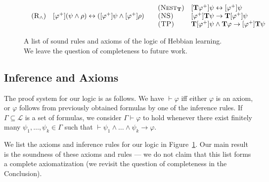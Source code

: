 \documentclass[letterpaper]{article}
\theoremstyle{definition}
\newcommand{\lang}{\mathcal{L}}
\newcommand{\proves}{\vdash}
\newcommand{\axiom}{\textsc}
\newcommand{\Typ}{\textrm{\textup{\textbf{T}}}}
\begin{document}
\begin{figure}[ht!]
\begin{equation*}
{\begin{array}{ll}
\begin{array}{ll}
        (\axiom{R}_\land) & [\varphi^+] (\psi \land \rho) \leftrightarrow ([\varphi^+] \psi \land [\varphi^+] \rho)\\
    \end{array}
    &
    \begin{array}{ll}
        (\axiom{Nest}_\Typ) & [\Typ \varphi^+] \psi \leftrightarrow [\varphi^+] \psi \\
    
        \axiom{(NS)} & [\varphi^+] \Typ \psi \to \Typ [\varphi^+] \psi\\
        
        \axiom{(TP)} & \Typ [\varphi^+] \psi \land \Typ \varphi \to [\varphi^+] \Typ \psi\\
    \end{array}
    \\
\end{array}
}
\end{equation*}
\caption{A list of sound rules and axioms of the logic of Hebbian learning.  We leave the question of completeness to future work.}
\label{fig:proof-system}
\end{figure}

\subsection{Inference and Axioms}

The proof system for our logic is as follows.  We have $\proves \varphi$ iff either $\varphi$ is an axiom, or $\varphi$ follows from previously obtained formulas by one of the inference rules.  If $\Gamma \subseteq \lang$ is a set of formulas, we consider $\Gamma \proves \varphi$ to hold whenever there exist finitely many $\psi_1, \ldots, \psi_k \in \Gamma$ such that $\proves \psi_1 \land \ldots \land \psi_k \to \varphi$.

We list the axioms and inference rules for our logic in Figure~\ref{fig:proof-system}.  Our main result is the soundness of these axioms and rules --- we do not claim that this list forms a complete axiomatization (we revisit the question of completeness in the Conclusion).
\end{document}
